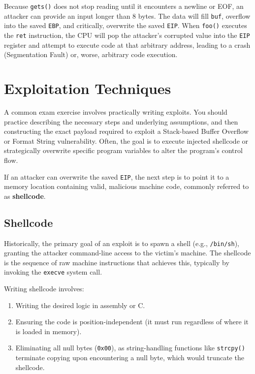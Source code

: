 Because \texttt{gets()} does not stop reading until it encounters a newline or EOF, an attacker can provide an input longer than 8 bytes. The data will fill \texttt{buf}, overflow into the saved \texttt{EBP}, and critically, overwrite the saved \texttt{EIP}. When \texttt{foo()} executes the \texttt{ret} instruction, the CPU will pop the attacker's corrupted value into the \texttt{EIP} register and attempt to execute code at that arbitrary address, leading to a crash (Segmentation Fault) or, worse, arbitrary code execution.

\section{Exploitation Techniques}

\begin{tcolorbox}[colback=blue!5!white,colframe=blue!75!black,title=Exam Insight]
A common exam exercise involves practically writing exploits. You should practice describing the necessary steps and underlying assumptions, and then constructing the exact payload required to exploit a Stack-based Buffer Overflow or Format String vulnerability. Often, the goal is to execute injected shellcode or strategically overwrite specific program variables to alter the program's control flow.
\end{tcolorbox}

If an attacker can overwrite the saved \texttt{EIP}, the next step is to point it to a memory location containing valid, malicious machine code, commonly referred to as \textbf{shellcode}.

\subsection{Shellcode}
Historically, the primary goal of an exploit is to spawn a shell (e.g., \texttt{/bin/sh}), granting the attacker command-line access to the victim's machine. The shellcode is the sequence of raw machine instructions that achieves this, typically by invoking the \texttt{execve} system call.

Writing shellcode involves:
\begin{enumerate}
    \item Writing the desired logic in assembly or C.
    \item Ensuring the code is position-independent (it must run regardless of where it is loaded in memory).
    \item Eliminating all null bytes (\texttt{0x00}), as string-handling functions like \texttt{strcpy()} terminate copying upon encountering a null byte, which would truncate the shellcode.
\end{enumerate}

